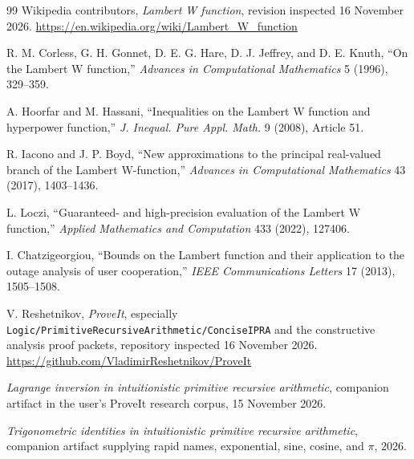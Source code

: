 \documentclass[11pt]{article}
\theoremstyle{definition}
\newcommand{\code}[1]{\nolinkurl{#1}}
\begin{document}
\begin{thebibliography}{99}
Wikipedia contributors,
\emph{Lambert W function}, revision inspected 16 November 2026.
\url{https://en.wikipedia.org/wiki/Lambert_W_function}

R. M. Corless, G. H. Gonnet, D. E. G. Hare, D. J. Jeffrey, and D. E. Knuth,
``On the Lambert W function,''
\emph{Advances in Computational Mathematics} 5 (1996), 329--359.

A. Hoorfar and M. Hassani,
``Inequalities on the Lambert W function and hyperpower function,''
\emph{J. Inequal. Pure Appl. Math.} 9 (2008), Article 51.

R. Iacono and J. P. Boyd,
``New approximations to the principal real-valued branch of the Lambert
W-function,'' \emph{Advances in Computational Mathematics} 43 (2017),
1403--1436.

L. Loczi,
``Guaranteed- and high-precision evaluation of the Lambert W function,''
\emph{Applied Mathematics and Computation} 433 (2022), 127406.

I. Chatzigeorgiou,
``Bounds on the Lambert function and their application to the outage analysis
of user cooperation,'' \emph{IEEE Communications Letters} 17 (2013),
1505--1508.

V. Reshetnikov,
\emph{ProveIt}, especially
\code{Logic/PrimitiveRecursiveArithmetic/ConciseIPRA} and the constructive
analysis proof packets, repository inspected 16 November 2026.
\url{https://github.com/VladimirReshetnikov/ProveIt}

\emph{Lagrange inversion in intuitionistic primitive recursive arithmetic},
companion artifact in the user's ProveIt research corpus, 15 November 2026.

\emph{Trigonometric identities in intuitionistic primitive recursive
arithmetic}, companion artifact supplying rapid names, exponential, sine,
cosine, and \(\pi\), 2026.
\end{thebibliography}
\end{document}
